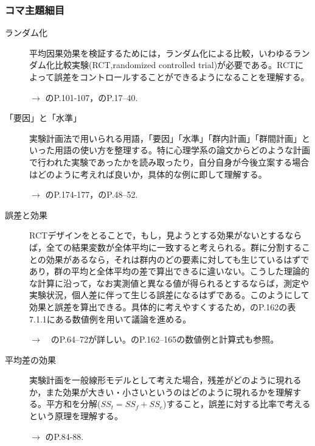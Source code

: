 \subsubsection{コマ主題細目}
\begin{description}
\item[ランダム化]平均因果効果を検証するためには，ランダム化による比較，いわゆるランダム化比較実験(RCT,randomized controlled trial)が必要である。RCTによって誤差をコントロールすることができるようになることを理解する。
\begin{flushright}
    $\to$ \citet{西内201301}のP.101-107，\citet{大村201301}のP.17--40.
\end{flushright}

\item[「要因」と「水準」]実験計画法で用いられる用語，「要因」「水準」「群内計画」「群間計画」といった用語の使い方を整理する。特に心理学系の論文からどのような計画で行われた実験であったかを読み取ったり，自分自身が今後立案する場合はどのように考えれば良いか，具体的な例に即して理解する。
\begin{flushright}
    $\to$ \citet{Yamada2004}のP.174-177，\citet{大村201301}のP.48--52.
\end{flushright}

\item[誤差と効果]RCTデザインをとることで，もし，見ようとする効果がないとするならば，全ての結果変数が全体平均に一致すると考えられる。群に分割することの効果があるなら，それは群内のどの要素に対しても生じているはずであり，群の平均と全体平均の差で算出できるに違いない。こうした理論的な計算に沿って，なお実測値と異なる値が得られるとするならば，測定や実験状況，個人差に伴って生じる誤差になるはずである。このようにして効果と誤差を算出できる。具体的に考えやすくするため，\citet{Yamada2004}のP.162の表7.1.1にある数値例を用いて議論を進める。
\begin{flushright}
    $\to$　\citet{大村201301}のP.64--72が詳しい。\citet{Yamada2004}のP.162--165の数値例と計算式も参照。
\end{flushright}

\item[平均差の効果]実験計画を一般線形モデルとして考えた場合，残差がどのように現れるか，また効果が大きい・小さいというのはどのように現れるかを理解する。平方和を分解($SS_t = SS_f+SS_e$)すること，誤差に対する比率で考えるという原理を理解する。
\begin{flushright}
    $\to$ \citet{大村201301}のP.84-88.
\end{flushright}


\end{description}
